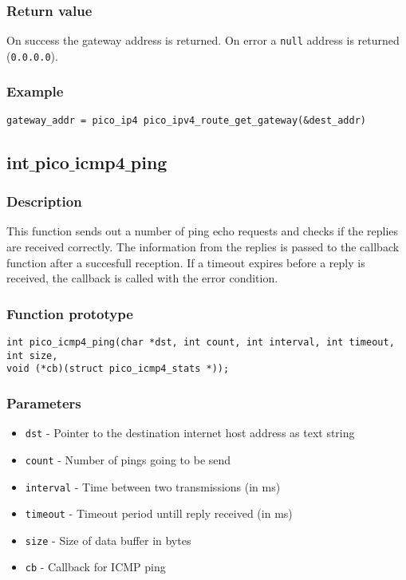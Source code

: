 \subsubsection*{Return value}
On success the gateway address is returned. On error a \texttt{null} address is returned (\texttt{0.0.0.0}).


\subsubsection*{Example}
\begin{verbatim}
gateway_addr = pico_ip4 pico_ipv4_route_get_gateway(&dest_addr)
\end{verbatim}


\subsection{int$\_$pico$\_$icmp4$\_$ping}

\subsubsection*{Description}
This function sends out a number of ping echo requests and checks if the replies are received correctly.
The information from the replies is passed to the callback function after a succesfull reception.
If a timeout expires before a reply is received, the callback is called with the error condition.

\subsubsection*{Function prototype}
\begin{verbatim}
int pico_icmp4_ping(char *dst, int count, int interval, int timeout, int size,
void (*cb)(struct pico_icmp4_stats *));
\end{verbatim}

\subsubsection*{Parameters}
\begin{itemize}[noitemsep]
\item \texttt{dst} - Pointer to the destination internet host address as text string
\item \texttt{count} - Number of pings going to be send
\item \texttt{interval} - Time between two transmissions (in ms)
\item \texttt{timeout} - Timeout period untill reply received (in ms)
\item \texttt{size} - Size of data buffer in bytes
\item \texttt{cb} - Callback for ICMP ping
\end{itemize}

